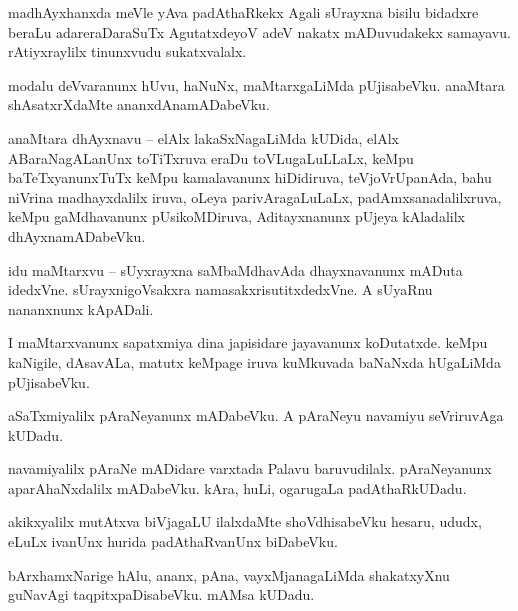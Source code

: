 \documentclass{article}
\begin{document}
\begin{mng}%
madhAyxhanxda meVle yAva padAthaRkekx Agali sUrayxna bisilu bidadxre beraLu adareraDaraSuTx 
AgutatxdeyoV adeV nakatx mADuvudakekx samayavu. rAtiyxraylilx tinunxvudu sukatxvalalx.
\end{mng}

\begin{mng}%
modalu deVvaranunx hUvu, haNuNx, maMtarxgaLiMda pUjisabeVku. anaMtara shAsatxrXdaMte 
ananxdAnamADabeVku.
\end{mng}

\begin{mng}%
anaMtara dhAyxnavu -- elAlx lakaSxNagaLiMda kUDida, elAlx ABaraNagALanUnx toTiTxruva eraDu 
toVLugaLuLLaLx, keMpu baTeTxyanunxTuTx keMpu kamalavanunx hiDidiruva, teVjoVrUpanAda, bahu 
niVrina madhayxdalilx iruva, oLeya parivAragaLuLaLx, padAmxsanadalilxruva, keMpu gaMdhavanunx 
pUsikoMDiruva, Aditayxnanunx pUjeya kAladalilx dhAyxnamADabeVku.
\end{mng}

\begin{mng}%
idu maMtarxvu -- sUyxrayxna saMbaMdhavAda dhayxnavanunx mADuta idedxVne. sUrayxnigoVsakxra 
namasakxrisutitxdedxVne. A sUyaRnu nananxnunx kApADali.
\end{mng}

\begin{mng}%
I maMtarxvanunx sapatxmiya dina japisidare jayavanunx koDutatxde. keMpu kaNigile, dAsavALa, matutx 
keMpage iruva kuMkuvada baNaNxda hUgaLiMda pUjisabeVku.
\end{mng}

\begin{mng}%
aSaTxmiyalilx pAraNeyanunx mADabeVku. A pAraNeyu navamiyu seVriruvAga kUDadu.
\end{mng}

\begin{mng}%
navamiyalilx pAraNe mADidare varxtada Palavu baruvudilalx. pAraNeyanunx aparAhaNxdalilx mADabeVku. 
kAra, huLi, ogarugaLa padAthaRkUDadu.
\end{mng}

\begin{mng}%
akikxyalilx mutAtxva biVjagaLU ilalxdaMte shoVdhisabeVku hesaru, ududx, eLuLx ivanUnx hurida 
padAthaRvanUnx biDabeVku.
\end{mng}

\begin{mng}%
bArxhamxNarige hAlu, ananx, pAna, vayxMjanagaLiMda shakatxyXnu guNavAgi taqpitxpaDisabeVku. mAMsa 
kUDadu.
\end{mng}
\end{document}
